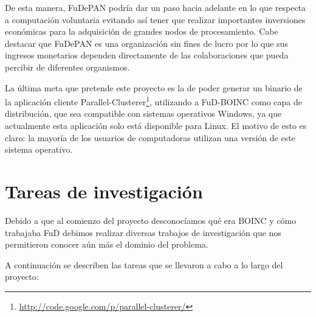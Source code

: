 De esta manera, FuDePAN podría dar un paso hacia adelante en lo que respecta a computación voluntaria evitando así tener que realizar importantes inversiones económicas para la adquisición de grandes nodos de procesamiento. Cabe destacar que FuDePAN es una organización sin fines de lucro por lo que sus ingresos monetarios dependen directamente de las colaboraciones que pueda percibir de diferentes organismos.

La última meta que pretende este proyecto es la de poder generar un binario de la aplicación cliente Parallel-Clusterer\footnote{\url{http://code.google.com/p/parallel-clusterer/}}, utilizando a FuD-BOINC como capa de distribución, que sea compatible con sistemas operativos Windows, ya que actualmente esta aplicación solo está disponible para Linux. El motivo de esto es claro: la mayoría de los usuarios de computadoras utilizan una versión de este sistema operativo.

\section{Tareas de investigación}

Debido a que al comienzo del proyecto desconocíamos qué era BOINC y cómo trabajaba FuD debimos realizar diversas trabajos de investigación que nos permitieron conocer aún más el dominio del problema.

A continuación se describen las tareas que se llevaron a cabo a lo largo del proyecto:

